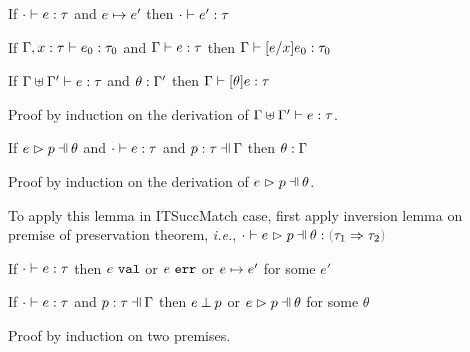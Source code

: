 \begin{theorem}[Preservation]
  \label{thrm:preservation}
  If $\cdot \vdash e : \tau$ and $e \mapsto e'$
  then $\cdot \vdash e' : \tau$
\end{theorem}

\begin{lemma}[Substitution]
  \label{lemma:substitution}
  If $\Gamma, x : \tau \vdash e_0 : \tau_0$ and $\Gamma \vdash e : \tau$
  then $\Gamma \vdash [e/x]e_0 : \tau_0$
\end{lemma}

\begin{lemma}
  \label{lemma:simult-substitution}
  If $\Gamma \uplus \Gamma' \vdash e : \tau$ and $\theta : \Gamma'$
  then $\Gamma \vdash [\theta]e : \tau$
\end{lemma}
Proof by induction on the derivation of $\Gamma \uplus \Gamma' \vdash e : \tau$.

\begin{lemma}
  \label{lemma:subs-typing}
  If $\hpatmatch{e}{p}{\theta}$ and $\cdot \vdash e : \tau$ and $\hpattyp{p}{\tau}{\Gamma}$
  then $\theta : \Gamma$
\end{lemma}
Proof by induction on the derivation of $\hpatmatch{e}{p}{\theta}$.

To apply this lemma in ITSuccMatch case, first apply inversion lemma on premise of preservation theorem,
\emph{i.e.}, $\hexptyp{\cdot}{\hpatmatch{e}{p}{\theta}}{\trul{\tau_1}{\tau_2}}$

\begin{theorem}[Progress]
  \label{thrm:progrs}
  If $\cdot \vdash e : \tau$
  then $e ~\mathtt{val}$ or $e ~\mathtt{err}$ or $e \mapsto e'$ for some $e'$
\end{theorem}

\begin{lemma}
  \label{lemma:match-progress}
  If $\cdot \vdash e : \tau$ and $\hpattyp{p}{\tau}{\Gamma}$
  then $e \mathbin{\bot} p$ or $\hpatmatch{e}{p}{\theta}$ for some $\theta$
\end{lemma}
Proof by induction on two premises.